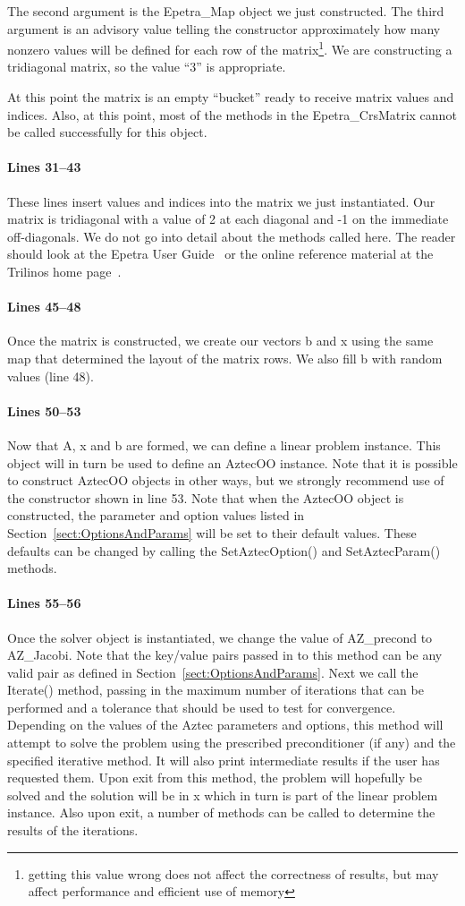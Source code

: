 \documentclass[12pt,relax]{AztecOOUserGuide}
\newcommand{\map}{Epetra\_Map}
\newcommand{\crsmatrix}{Epetra\_CrsMatrix}
\begin{document}
The second argument is the \map{} object we just constructed.  The
third argument is an advisory value telling the constructor
approximately how many nonzero values will be defined for each row of
the matrix\footnote{getting this value wrong does not
affect the correctness of results, but may affect performance and
efficient use of memory}.  We are constructing a tridiagonal matrix, 
so the value ``3'' is appropriate.

At this point the matrix is an empty ``bucket'' ready to receive
matrix values and indices.  Also, at this point, most of the methods
in the \crsmatrix{} cannot be called successfully for this object.
\paragraph{Lines 31--43}
These lines insert values and indices into the matrix we just
instantiated.  Our matrix is tridiagonal with a value of 2 at each
diagonal and -1 on the immediate off-diagonals.  We do not go into
detail about the methods called here.  The reader should look at the
Epetra User Guide~\cite{Epetra-User-Guide} or the online reference
material at the Trilinos home page~\cite{trilinos-home-page}.
\paragraph{Lines 45--48}
Once the matrix is constructed, we create our vectors b and x using
the same map that determined the layout of the matrix rows.  We also
fill b with random values (line 48).
\paragraph{Lines 50--53}
Now that A, x and b are formed, we can define a linear problem
instance.  This object will in turn be used to define an AztecOO
instance.  Note that it is possible to construct AztecOO objects in
other ways, but we strongly recommend use of the constructor shown in
line 53.  Note that when the AztecOO object is constructed, the
parameter and option values listed in
Section~\ref{sect:OptionsAndParams} will be set to their default
values.  These defaults can be changed by calling the SetAztecOption()
and SetAztecParam() methods.
\paragraph{Lines 55--56}
Once the solver object is instantiated, we change the value of
AZ\_precond to AZ\_Jacobi.  Note that the key/value pairs passed in to
this method can be any valid pair as defined in
Section~\ref{sect:OptionsAndParams}.  Next we call the Iterate()
method, passing in the maximum number of iterations that can be
performed and a tolerance that should be used to test for
convergence.  Depending on the values of the Aztec parameters and
options, this method will attempt to solve the problem using the
prescribed preconditioner (if any) and the specified iterative
method.  It will also print intermediate results if the user has
requested them.  Upon exit from this method, the problem will
hopefully be solved and the solution will be in x which in turn is
part of the linear problem instance.  Also upon exit, a number of
methods can be called to determine the results of the iterations.
\end{document}
